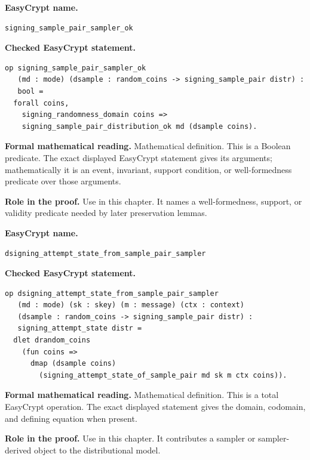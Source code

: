 \begin{formaldefinition}
\noindent\textbf{EasyCrypt name.}
\begin{lstlisting}[language=EasyCrypt,basicstyle=\ttfamily\scriptsize]
signing_sample_pair_sampler_ok
\end{lstlisting}
\noindent\textbf{Checked EasyCrypt statement.}
\begin{lstlisting}[language=EasyCrypt,basicstyle=\ttfamily\scriptsize]
op signing_sample_pair_sampler_ok
   (md : mode) (dsample : random_coins -> signing_sample_pair distr) :
   bool =
  forall coins,
    signing_randomness_domain coins =>
    signing_sample_pair_distribution_ok md (dsample coins).
\end{lstlisting}
\noindent\textbf{Formal mathematical reading.}
Mathematical definition. This is a Boolean predicate.  The exact displayed EasyCrypt statement gives its arguments; mathematically it is an event, invariant, support condition, or well-formedness predicate over those arguments.

\noindent\textbf{Role in the proof.}
Use in this chapter. It names a well-formedness, support, or validity predicate needed by later preservation lemmas.

\end{formaldefinition}

\begin{formaldefinition}
\noindent\textbf{EasyCrypt name.}
\begin{lstlisting}[language=EasyCrypt,basicstyle=\ttfamily\scriptsize]
dsigning_attempt_state_from_sample_pair_sampler
\end{lstlisting}
\noindent\textbf{Checked EasyCrypt statement.}
\begin{lstlisting}[language=EasyCrypt,basicstyle=\ttfamily\scriptsize]
op dsigning_attempt_state_from_sample_pair_sampler
   (md : mode) (sk : skey) (m : message) (ctx : context)
   (dsample : random_coins -> signing_sample_pair distr) :
   signing_attempt_state distr =
  dlet drandom_coins
    (fun coins =>
      dmap (dsample coins)
        (signing_attempt_state_of_sample_pair md sk m ctx coins)).
\end{lstlisting}
\noindent\textbf{Formal mathematical reading.}
Mathematical definition. This is a total EasyCrypt operation.  The exact displayed statement gives the domain, codomain, and defining equation when present.

\noindent\textbf{Role in the proof.}
Use in this chapter. It contributes a sampler or sampler-derived object to the distributional model.

\end{formaldefinition}

